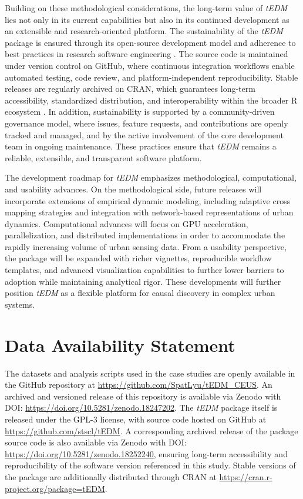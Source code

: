 \documentclass[authoryear,preprint,review,12pt]{elsarticle}
\begin{document}
Building on these methodological considerations, the long-term value of \textit{tEDM} lies not only in its current capabilities but also in its continued development as an extensible and research-oriented platform. The sustainability of the \textit{tEDM} package is ensured through its open-source development model and adherence to best practices in research software engineering \citep{ropensci}. The source code is maintained under version control on GitHub, where continuous integration workflows enable automated testing, code review, and platform-independent reproducibility. Stable releases are regularly archived on CRAN, which guarantees long-term accessibility, standardized distribution, and interoperability within the broader R ecosystem \citep{r}. In addition, sustainability is supported by a community-driven governance model, where issues, feature requests, and contributions are openly tracked and managed, and by the active involvement of the core development team in ongoing maintenance. These practices ensure that \textit{tEDM} remains a reliable, extensible, and transparent software platform.

The development roadmap for \textit{tEDM} emphasizes methodological, computational, and usability advances. On the methodological side, future releases will incorporate extensions of empirical dynamic modeling, including adaptive cross mapping strategies and integration with network-based representations of urban dynamics. Computational advances will focus on GPU acceleration, parallelization, and distributed implementations in order to accommodate the rapidly increasing volume of urban sensing data. From a usability perspective, the package will be expanded with richer vignettes, reproducible workflow templates, and advanced visualization capabilities to further lower barriers to adoption while maintaining analytical rigor. These developments will further position \textit{tEDM} as a flexible platform for causal discovery in complex urban systems.

\section*{Data Availability Statement}

The datasets and analysis scripts used in the case studies are openly available in the GitHub repository at \url{https://github.com/SpatLyu/tEDM_CEUS}. An archived and versioned release of this repository is available via Zenodo with DOI: \url{https://doi.org/10.5281/zenodo.18247202}. The \textit{tEDM} package itself is released under the GPL-3 license, with source code hosted on GitHub at \url{https://github.com/stscl/tEDM}. A corresponding archived release of the package source code is also available via Zenodo with DOI: \url{https://doi.org/10.5281/zenodo.18252240}, ensuring long-term accessibility and reproducibility of the software version referenced in this study. Stable versions of the package are additionally distributed through CRAN at \url{https://cran.r-project.org/package=tEDM}.
\end{document}
